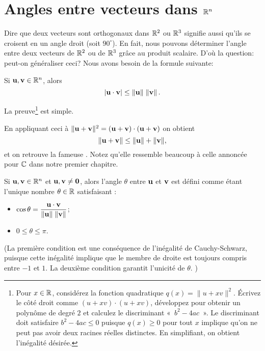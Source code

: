 \section{Angles entre vecteurs dans \texorpdfstring{$\mathbb{R}^n$}{Rn}}

Dire que deux vecteurs sont orthogonaux dans $\mathbb{R}^2$ ou $\mathbb{R}^3$ signifie aussi qu'ils se croisent en un angle droit (soit $90^\circ$).  En fait, nous pouvons déterminer l'angle entre deux vecteurs de $\mathbb{R}^2$ ou de $\mathbb{R}^3$ grâce au produit scalaire. D'o\`u la question: 
peut-on généraliser ceci?  Nous avons besoin de la formule suivante:


\begin{theorem} 
Si $\mathbf{u},\mathbf{v} \in \mathbb{R}^n$, alors 
$$
\vert \mathbf{u} \cdot \mathbf{v} \vert \leq \Vert \mathbf{u} \Vert \; \Vert \mathbf{v} \Vert\,.
$$
\end{theorem}

La preuve\footnote{Pour $x\in\mathbb{R}$, considérez la fonction quadratique $q(x)=\|u+ x v\|^2$. Écrivez le côté droit comme $(u+ x v)\cdot (u+ x v)$, développez pour obtenir un polynôme de degré $2$ et calculez le discriminant «~$b^2-4ac$~». Le discriminant doit satisfaire $b^2-4ac\le 0$ puisque $q(x)\ge 0$ pour tout $x$ implique qu'on ne peut pas avoir deux racines réelles distinctes. En simplifiant, on obtient l'inégalité désirée.} est simple.

En appliquant ceci à $\Vert \mathbf{u} + \mathbf{v} \Vert^2 = (\mathbf{u} + \mathbf{v})\cdot(\mathbf{u}+\mathbf{v})$
on obtient
$$
\Vert \mathbf{u} + \mathbf{v} \Vert \leq \Vert \mathbf{u} \Vert + \Vert \mathbf{v} \Vert,
$$
et on retrouve la fameuse . Notez qu'elle ressemble beaucoup à celle annoncée pour $\mathbb{C}$
dans notre premier chapitre.

\begin{definition}
Si $\mathbf{u},\mathbf{v} \in \mathbb{R}^n$ et $\mathbf{u},\mathbf{v} \neq \mathbf{0}$, alors l'angle
$\theta$ entre $\mathbf{u}$ et $\mathbf{v}$ est défini comme étant l'unique nombre
$\theta\in\mathbb{R}$ satisfaisant :
\begin{itemize}
\item $\displaystyle \cos \theta = \frac{\mathbf{u} \cdot \mathbf{v}}{\Vert \mathbf{u} \Vert\; \Vert \mathbf{v} \Vert}$;
\item $0 \leq \theta \leq \pi$.
\end{itemize}
(La première condition est une conséquence de l'inégalité de Cauchy-Schwarz, puisque cette inégalité implique que le membre de droite est toujours compris entre $-1$ et $1$. La deuxième condition garantit l'unicité de $\theta$. )
\end{definition}

